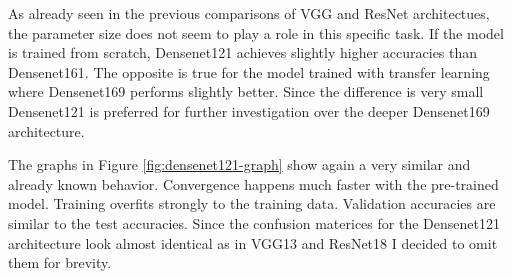 \begin{table}[!h] \centering
{}
\caption{Hyper parameters for densenet121 optimized with SigOpt. First row shows hyperparameters training the architecture from scratch. Second row used pre-trained weights from ImageNet}
\label{tbl:Densenet121_overview}
\end{table}

\quad

As already seen in the previous comparisons of VGG and ResNet architectues, the parameter size does not seem to play a role in this specific task. If the model is trained from scratch, Densenet121 achieves slightly higher accuracies than Densenet161. The opposite is true for the model trained with transfer learning where Densenet169 performs slightly better. Since the difference is very small Densenet121 is preferred for further investigation over the deeper Densenet169 architecture.

The graphs in Figure \ref{fig:densenet121-graph} show again a very similar and already known behavior. Convergence happens much faster with the pre-trained model. Training overfits strongly to the training data. Validation accuracies are similar to the test accuracies. Since the confusion materices for the Densenet121 architecture look almost identical as in VGG13 and ResNet18 I decided to omit them for brevity. \\


